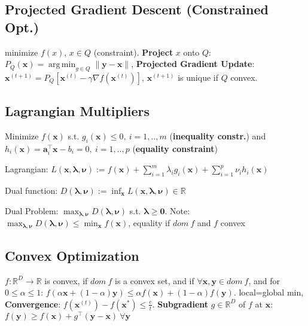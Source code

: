 \documentclass[a4paper, 11pt, landscape]{article}
\DeclareMathOperator*{\argmin}{arg\,min}
\begin{document}
\begin{multicols*}{3}
\subsection{Projected Gradient Descent (Constrained Opt.)}
minimize $f(x)$, $x \in Q$ (constraint).
\textbf{Project} $x$ onto $Q$: $P_Q(\mathbf{x}) = \argmin_{y \in Q} \|\mathbf{y} - \mathbf{x}\|$,
\textbf{Projected Gradient Update}: $\mathbf{x}^{(t+1)} = P_Q[\mathbf{x}^{(t)} - \gamma \nabla f(\mathbf{x}^{(t)})]$,
$\mathbf{x}^{(t+1)}$ is unique if $Q$ convex.

\subsection{Lagrangian Multipliers}
Minimize  $f(\mathbf{x})$ s.t. $g_i(\mathbf{x}) \leq 0,\ i = 1, .., m$ (\textbf{inequality constr.}) and $h_i(\mathbf{x}) = \mathbf{a}_i^\top \mathbf{x} - b_i = 0,\ i = 1, .., p$ (\textbf{equality constraint})
\begin{compactdesc}
	\item[Lagrangian:] $L(\mathbf{x}, \boldsymbol{\lambda}, \boldsymbol{\nu}) := f(\mathbf{x}) + \sum_{i=1}^m \lambda_i g_i(\mathbf{x}) + \sum_{i=1}^p \nu_i h_i(\mathbf{x})$
	\item[Dual function:] $D(\boldsymbol{\lambda}, \boldsymbol{\nu}) := \inf_{\mathbf{x}} L(\mathbf{x}, \boldsymbol{\lambda}, \boldsymbol{\nu}) \in \mathbb{R}$
	\item[Dual Problem:] $\max_{\boldsymbol{\lambda}, \boldsymbol{\nu}} D(\boldsymbol{\lambda}, \boldsymbol{\nu})$ s.t. $\boldsymbol{\lambda} \geq \mathbf{0}$. Note: $\max_{\boldsymbol{\lambda}, \boldsymbol{\nu}} D(\boldsymbol{\lambda}, \boldsymbol{\nu}) \le \min_\mathbf{x}{f(\mathbf{x})}$, equality if $dom\ f$ and $f$ convex
\end{compactdesc}

\subsection{Convex Optimization}
$f : \mathbb{R}^D \rightarrow \mathbb{R}$ is convex, if $dom\ f$ is a convex set, and if $\forall \mathbf{x}, \mathbf{y} \in dom\ f$, and for $0 \leq \alpha \leq 1$: $f(\alpha \mathbf{x} + (1 - \alpha)\mathbf{y}) \leq \alpha f(\mathbf{x}) + (1-\alpha)f(\mathbf{y})$. local=global min, \textbf{Convergence}: $f(\mathbf{x}^{(t)}) - f(\mathbf{x}^*) \le \frac{c}{t}$. 
\textbf{Subgradient} $g \in \mathbb{R}^D$ of $f$ at $\mathbf{x}$: $f(\mathbf{y}) \geq f(\mathbf{x}) + g^\top(\mathbf{y}-\mathbf{x}) \ \forall \mathbf{y}$


\end{multicols*}
\end{document}
